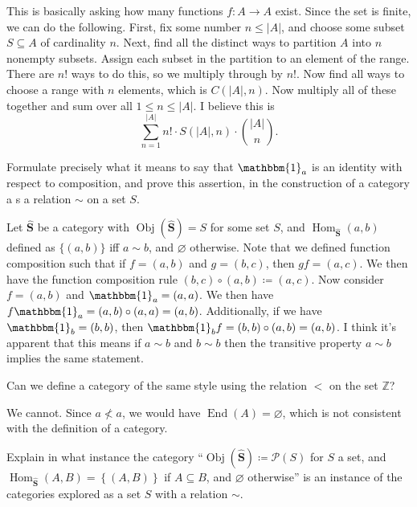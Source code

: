 \documentclass[11pt]{report}
\DeclareMathOperator{\End}{End}
\DeclareMathOperator{\Hom}{Hom}
\DeclareMathOperator{\Obj}{Obj}
\begin{document}
\begin{solution}
	This is basically asking how many functions $f : A \to A$ exist. Since the set is finite, we can do the following. First, fix some number $n\leq \left| A \right| $, and choose some subset $S\subseteq A$ of cardinality $n$. Next, find all the distinct ways to partition $A$ into $n$ nonempty subsets. Assign each subset in the partition to an element of the range. There are $n!$ ways to do this, so we multiply through by $n!$. Now find all ways to choose a range with $n$ elements, which is $C(\left| A \right| ,n)$. Now multiply all of these together and sum over all $1\leq n\leq \left| A \right| $. I believe this is
	\[
		\sum_{n=1}^{\left| A \right| } n!\cdot  S(\left| A \right| ,n)\cdot \binom{\left| A \right| }{n}
	.\]
\end{solution}
\begin{exercise}
	Formulate precisely what it means to say that $\mathbbm{1}_{a} $ is an identity with respect to composition, and prove this assertion, in the construction of a category a s a relation $\sim $ on a set $S$.
\end{exercise}
\begin{solution}
	Let $\hat{\mathbf{S}}$ be a category with $\Obj( \hat{\mathbf{S}} ) =S$ for some set $S$, and $\Hom_{\hat{\mathbf{S}}}(a , b) $ defined as $\{(a,b)\}$ iff $a\sim b$, and $\varnothing$ otherwise. Note that we defined function composition such that if $f=(a,b)$ and $g=(b,c)$, then $gf=(a,c)$. We then have the function composition rule $(b,c)\circ (a,b)\coloneqq (a,c)$. Now consider $f=(a,b)$ and $\mathbbm{1}_{a} =(a,a)$. We then have $f\mathbbm{1}_{a} =(a,b)\circ (a,a)=(a,b)$. Additionally, if we have $\mathbbm{1}_{b} =(b,b)$, then $\mathbbm{1}_{b} f=(b,b)\circ (a,b)=(a,b)$. I think it's apparent that this means if $a\sim b$ and $b\sim b$ then the transitive property $a\sim b$ implies the same statement.
\end{solution}
\begin{exercise}
	Can we define a category of the same style using the relation $<$ on the set $\mathbb{Z}$?
\end{exercise}
\begin{solution}
	We cannot. Since $a\nless a$, we would have $\End(A) =\varnothing$, which is not consistent with the definition of a category.
\end{solution}
\begin{exercise}
	Explain in what instance the category ``$\Obj( \hat{\mathbf{S}} ) \coloneqq \mathscr{P} (S)$ for $S$ a set, and $\Hom_{ \hat{\mathbf{S}} }(A , B) =\left\{ (A,B) \right\} $ if $A\subseteq B$, and $\varnothing$ otherwise'' is an instance of the categories explored as a set $S$ with a relation $\sim $.
\end{exercise}
\end{document}

